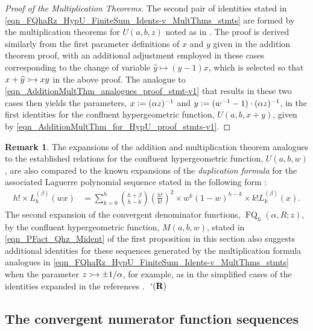 \documentclass[12pt,reqno]{article}
\numberwithin{sfootnote}{section}
\numberwithin{equation}{section}
\theoremstyle{DefaultTheoremStyle}
\theoremstyle{definition}
\newtheorem{remark}[theorem]{Remark}
\newcommand{\eolqedsymbol}[1]{{\hrulefill\ensuremath{\ #1}}}
\renewcommand{\eolqedsymbol}[1]{{\mboxfill{ }\ensuremath{\ #1}}}
\newcommand{\RemarkQEDSymbol}{`(\text{\rm{\bf R}})}
\newcommand{\RemarkQED}{\eolqedsymbol{\RemarkQEDSymbol}}
\newcommand{\cf}[0]{cf.\ }
\newcommand{\defequals}{\ensuremath{\vcentcolon=}}
\newcommand{\defmapsto}{\ensuremath{\vcentcolon\mapsto}}
\newcommand{\HypU}[3]{\ensuremath{U\left(#1, #2, #3\right)}}
\newcommand{\HypM}[3]{\ensuremath{M\left(#1, #2, #3\right)}}
\newcommand{\ConvFQ}[4]{\ensuremath{\FQ_{#1}\left(#2, #3; #4\right)}}
\DeclareMathOperator{\FQ}{FQ}
\begin{document}
\begin{proof}[Proof of the Multiplication Theorems] 
The second pair of identities stated in 
\eqref{eqn_FQhaRz_HypU_FiniteSum_Idents-v_MultThms_stmts} 
are formed by the 
multiplication theorems for $\HypU{a}{b}{z}$ noted as in 
\citep[\S 13.13(iii)]{NISTHB}. 
The proof is derived similarly from the first parameter 
definitions of $x$ and $y$ given in the addition theorem proof, 
with an additional adjustment employed in these cases 
corresponding to the change of variable 
$\widehat{y} \mapsto (y-1) x$, which is selected so that 
$x + \widehat{y} \defmapsto xy$ in the above proof. 
The analogue to 
\eqref{eqn_AdditionMultThm_analogues_proof_stmt-v1} 
that results in these two cases then 
yields the parameters, 
$x \defequals (\alpha z)^{-1}$ and $y \defequals (w^{-1}-1) \cdot (\alpha z)^{-1}$, 
in the first identities for the 
confluent hypergeometric function, $\HypU{a}{b}{x+y}$, 
given by \eqref{eqn_AdditionMultThm_for_HypU_proof_stmts-v1}. 
\end{proof} 

\begin{remark} 
The expansions of the addition and multiplication theorem analogues to the 
established relations for the confluent hypergeometric function, 
$\HypU{a}{b}{w}$, are also compared to the known expansions of the 
\emph{duplication formula} for the associated Laguerre polynomial 
sequence stated in the following form 
\citep[\S 5.1]{UC} \citep[\cf \S 18.18(iii)]{NISTHB}: 
\begin{align*} 
h! \times L_h^{(\beta)}(wx) & = 
     \sum_{k=0}^{h} \binom{h+\beta}{h-k} \left(\frac{h!}{k!}\right)^{2} 
     \times w^{k} (1-w)^{h-k} \times k! L_k^{(\beta)}(x). 
\end{align*} 
The second expansion of the convergent denominator functions, 
$\ConvFQ{h}{\alpha}{R}{z}$, by the 
confluent hypergeometric function, $\HypM{a}{b}{w}$, stated in 
\eqref{eqn_PFact_Qhz_Mident} of the first proposition in this section 
also suggests additional identities for these sequences generated by the 
multiplication formula analogues in 
\eqref{eqn_FQhaRz_HypU_FiniteSum_Idents-v_MultThms_stmts} 
when the parameter $z \defmapsto \pm 1 / \alpha$, for example, as in the 
simplified cases of the identities expanded in the references 
\citep[\S 5.5 -- \S 5.6; Ex.\ 5.29]{GKP} 
\citep[\cf \S 15]{NISTHB}. 
\RemarkQED 
\end{remark} 

\subsection{The convergent numerator function sequences} 
\label{subsubSection_Properties_Of_ConvFn_Phz} 
\end{document}

